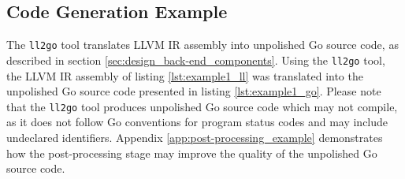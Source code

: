
\subsection{Code Generation Example}
\label{app:code_generation_example}

The \texttt{ll2go} tool translates LLVM IR assembly into unpolished Go source code, as described in section \ref{sec:design_back-end_components}. Using the \texttt{ll2go} tool, the LLVM IR assembly of listing \ref{lst:example1_ll} was translated into the unpolished Go source code presented in listing \ref{lst:example1_go}. Please note that the \texttt{ll2go} tool produces unpolished Go source code which may not compile, as it does not follow Go conventions for program status codes and may include undeclared identifiers. Appendix \ref{app:post-processing_example} demonstrates how the post-processing stage may improve the quality of the unpolished Go source code.



